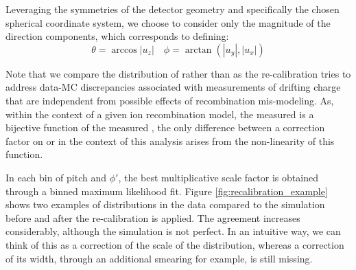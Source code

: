 Leveraging the symmetries of the detector geometry and specifically the chosen spherical coordinate system, we choose to consider only the magnitude of the direction components, which corresponds to defining:
\begin{equation}
\label{eq:phi}
\theta = \arccos{|u_z|} \quad \phi = \arctan{(|u_y|, |u_x|)}
\end{equation}

Note that we compare the distribution of \dqdx rather than \dedx as the re-calibration tries to address data-MC discrepancies associated with measurements of drifting charge that are independent from possible effects of recombination mis-modeling.
As, within the context of a given ion recombination model, the measured \dedx is a bijective function of the measured \dqdx, the only difference between a correction factor on \dqdx or \dedx in the context of this analysis arises from the non-linearity of this function.

In each bin of pitch and $\phi'$, the best multiplicative scale factor is obtained through a binned maximum likelihood fit.
Figure \ref{fig:recalibration_example} shows two examples of \dqdx distributions in the data compared to the simulation before and after the re-calibration is applied.
The agreement increases considerably, although the simulation is not perfect.
In an intuitive way, we can think of this as a correction of the scale of the distribution, whereas a correction of its width, through an additional smearing for example, is still missing.

